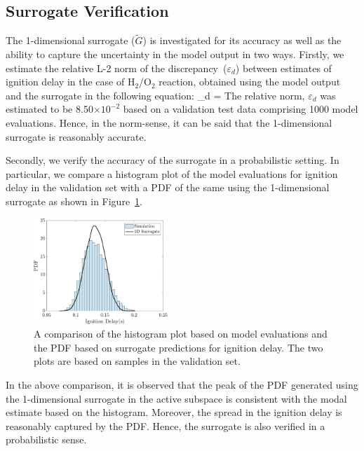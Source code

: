 \subsection{Surrogate Verification}
\label{sub:verify}

The 1-dimensional surrogate ($\tilde{G}$) is investigated for its accuracy as well as the ability to capture the 
uncertainty in the
model output in two ways. Firstly, we estimate the relative L-2 norm of the discrepancy~($\varepsilon_d$)
between estimates of ignition delay in the case of H$_2$/O$_2$ reaction, obtained using the 
model output and the surrogate in the following equation:
%
\be
\varepsilon_d = 
\ee
%
The relative norm, $\varepsilon_d$ was estimated to be 8.50$\times10^{-2}$ based on a validation test data
comprising 1000 model evaluations. Hence, in the norm-sense, it can be said that the 1-dimensional surrogate is 
reasonably accurate. 

Secondly, we verify the accuracy of the surrogate in a probabilistic setting. In particular, we compare a histogram
plot of the model evaluations for ignition delay in the validation set with a PDF of the same using the 1-dimensional
surrogate as shown in Figure~\ref{fig:pdf_33D}.
%
\begin{figure}[htbp]
 \begin{center}
  \includegraphics[width=0.45\textwidth]{./Figures/pdf_comp_id_1e4}
\caption{A comparison of the histogram plot based on model evaluations and the PDF based on surrogate
predictions for ignition delay. The two plots are based on samples in the validation set.}
\label{fig:pdf_33D}
\end{center}
\end{figure}
%
In the above comparison, it is observed that the peak of the PDF generated using the 1-dimensional surrogate in the
active subspace is consistent with the modal estimate based on the histogram. Moreover, the spread in the ignition
 delay is reasonably captured by the PDF. Hence, the surrogate is also verified in a probabilistic sense. 
 






























